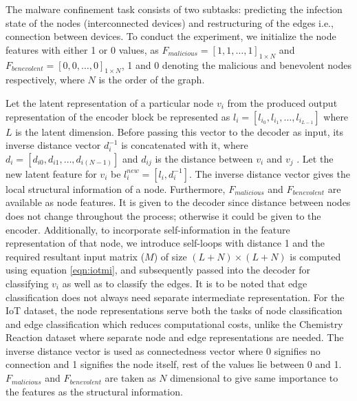 The malware confinement task consists of two subtasks: predicting the infection state of the nodes (interconnected devices) and restructuring of the edges i.e., connection between devices. To conduct the experiment, we initialize the node features with either 1 or 0 values, as $F_{malicious} = [1, 1, \dots , 1]_{1\times N}$ and $F_{benevolent} = [0, 0, \dots , 0]_{1\times N}$, 1 and 0 denoting the malicious and benevolent nodes respectively, where $N$ is the order of the graph. 

Let the latent representation of a particular node $v_i$ from the produced output representation of the encoder block be represented as $l_i=[l_{i_0}, l_{i_1}, \dots , l_{i_{L-1}}]$ where $L$ is the latent dimension. Before passing this vector to the decoder as input, its inverse distance vector $d_{i}^{-1}$ is concatenated with it, where $d_i=[d_{i0}, d_{i1}, \dots , d_{i(N-1)}]$ and $d_{ij}$ is the distance between $v_i$ and $v_j$ . Let the new latent feature for $v_i$ be $l_i^{new}=\left[ l_i,d_i^{-1} \right]$. The inverse distance vector gives the local structural information of a node. Furthermore, $F_{malicious}$ and $F_{benevolent}$ are available as node features. It is given to the decoder since distance between nodes does not change throughout the process; otherwise it could be given to the encoder. Additionally, to incorporate self-information in the feature representation of that node, we introduce self-loops with distance 1 and the required resultant input matrix ($M$)  of size $(L+N)\times (L+N)$ is computed using equation \ref{eqn:iotmi}, and subsequently passed into the decoder for classifying $v_i$ as well as to classify the edges. It is to be noted that edge classification does not always need separate intermediate representation. For the IoT dataset, the node representations serve both the tasks of node classification and edge classification which reduces computational costs, unlike the Chemistry Reaction dataset where separate node and edge representations are needed. The inverse distance vector is used as connectedness vector where 0 signifies no connection and 1 signifies the node itself, rest of the values lie between 0 and 1. 
$F_{malicious}$ and $F_{benevolent}$ are taken as $N$ dimensional to give same importance to the features as the structural information.
